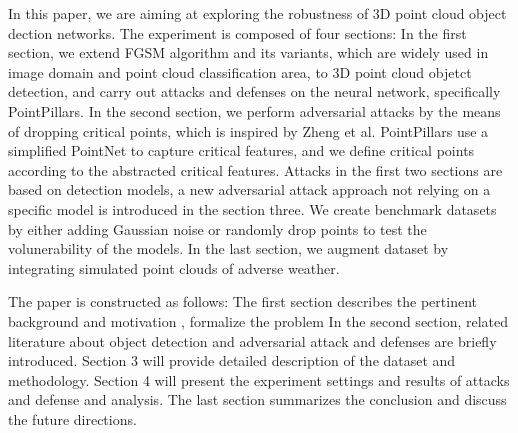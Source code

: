 In this paper, we are aiming at exploring the robustness of 3D point cloud object dection networks. The experiment is composed of four sections: In the first section, we extend FGSM algorithm and its variants, which are widely used in image domain and point cloud classification area, to 3D point cloud objetct detection, and carry out attacks and defenses on the neural network, specifically PointPillars\cite{lang_pointpillars_2019}. In the second section, we perform adversarial attacks by the means of dropping critical points, which is inspired by Zheng et al.\cite{zheng_pointcloud_2019} PointPillars use a simplified PointNet\cite{qi_pointnet_2017} to capture critical features, and we define critical points according to the abstracted critical features. Attacks in the first two sections are based on detection models, a new adversarial attack approach not relying on a specific model is introduced in the section three. We create benchmark datasets by either adding Gaussian noise or randomly drop points to test the volunerability of the models. In the last section, we augment dataset by integrating simulated point clouds of adverse weather. 

The paper is constructed as follows: The first section describes the pertinent background and motivation , formalize the problem 
In the second section, related literature about object detection and adversarial attack and defenses are briefly introduced.  Section 3 will provide detailed description of the dataset and methodology. Section 4 will present the experiment settings and results of attacks and defense and analysis. The last section summarizes the conclusion and discuss the future directions.
